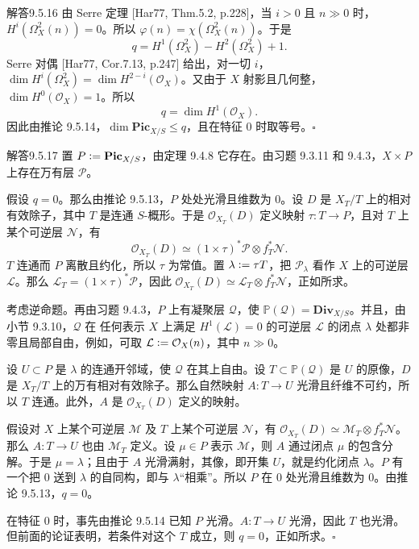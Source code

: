 \begin{origstatement}{解答}{9.5.16}\label{appA:ans9516}
由 Serre 定理 [Har77, Thm.5.2, p.228]，当 $i>0$ 且 $n\gg0$ 时，$H^i(\Omega_X^2(n))=0$。所以 $\varphi(n)=\chi(\Omega_X^2(n))$。于是
\[
 q=H^1(\Omega_X^2)-H^2(\Omega_X^2)+1.
\]
Serre 对偶 [Har77, Cor.7.13, p.247] 给出，对一切 $i$，$\dim H^i(\Omega_X^2)=\dim H^{2-i}(\mathcal O_X)$。又由于 $X$ 射影且几何整，$\dim H^0(\mathcal O_X)=1$。所以
\[
 q=\dim H^1(\mathcal O_X).
\]
因此由推论 9.5.14，$\dim\mathbf{Pic}_{X/S}\leq q$，且在特征 $0$ 时取等号。\hfill$\square$
\end{origstatement}

\begin{origstatement}{解答}{9.5.17}\label{appA:ans9517}
置 $P\mathrel{\mathop:}=\mathbf{Pic}_{X/S}$，由定理 9.4.8 它存在。由习题 9.3.11 和 9.4.3，$X\times P$ 上存在万有层 $\mathcal P$。

假设 $q=0$。那么由推论 9.5.13，$P$ 处处光滑且维数为 $0$。设 $D$ 是 $X_T/T$ 上的相对有效除子，其中 $T$ 是连通 $S$-概形。于是 $\mathcal O_{X_T}(D)$ 定义映射 $\tau\colon T\to P$，且对 $T$ 上某个可逆层 $\mathcal N$，有
\[
 \mathcal O_{X_T}(D)\simeq(1\times\tau)^*\mathcal P\otimes f_T^*\mathcal N.
\]
$T$ 连通而 $P$ 离散且约化，所以 $\tau$ 为常值。置 $\lambda\mathrel{\mathop:}=\tau T$，把 $\mathcal P_\lambda$ 看作 $X$ 上的可逆层 $\mathcal L$。那么 $\mathcal L_T=(1\times\tau)^*\mathcal P$，因此 $\mathcal O_{X_T}(D)\simeq\mathcal L_T\otimes f_T^*\mathcal N$，正如所求。

考虑逆命题。再由习题 9.4.3，$P$ 上有凝聚层 $\mathcal Q$，使 $\mathbb P(\mathcal Q)=\mathbf{Div}_{X/S}$。并且，由小节 9.3.10，$\mathcal Q$ 在
任何表示 $X$ 上满足 $H^1(\mathcal L)=0$ 的可逆层 $\mathcal L$ 的闭点 $\lambda$ 处都非零且局部自由，例如，可取 $\mathcal L\mathrel{\mathop:}=\mathcal O_X(n)$，其中 $n\gg0$。

设 $U\subset P$ 是 $\lambda$ 的连通开邻域，使 $\mathcal Q$ 在其上自由。设 $T\subset\mathbb P(\mathcal Q)$ 是 $U$ 的原像，$D$ 是 $X_T/T$ 上的万有相对有效除子。那么自然映射 $A\colon T\to U$ 光滑且纤维不可约，所以 $T$ 连通。此外，$A$ 是 $\mathcal O_{X_T}(D)$ 定义的映射。

假设对 $X$ 上某个可逆层 $\mathcal M$ 及 $T$ 上某个可逆层 $\mathcal N$，有 $\mathcal O_{X_T}(D)\simeq\mathcal M_T\otimes f_T^*\mathcal N$。那么 $A\colon T\to U$ 也由 $\mathcal M_T$ 定义。设 $\mu\in P$ 表示 $\mathcal M$，则 $A$ 通过闭点 $\mu$ 的包含分解。于是 $\mu=\lambda$；且由于 $A$ 光滑满射，其像，即开集 $U$，就是约化闭点 $\lambda$。$P$ 有一个把 $0$ 送到 $\lambda$ 的自同构，即与 $\lambda$“相乘”。所以 $P$ 在 $0$ 处光滑且维数为 $0$。由推论 9.5.13，$q=0$。

在特征 $0$ 时，事先由推论 9.5.14 已知 $P$ 光滑。$A\colon T\to U$ 光滑，因此 $T$ 也光滑。但前面的论证表明，若条件对这个 $T$ 成立，则 $q=0$，正如所求。\hfill$\square$
\end{origstatement}

